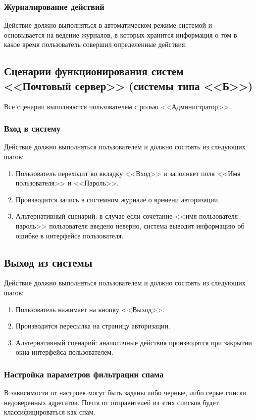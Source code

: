 \subsubsection{Журналирование действий}
Действие должно выполняться в автоматическом режиме системой и основывается на ведение журналов, в которых хранится информация о том в какое время пользователь совершил определенные действия.

\subsection{Сценарии функционирования систем <<Почтовый сервер>> (системы типа <<Б>>)}
Все сценарии выполняются пользователем с ролью <<Администратор>>.

\subsubsection{Вход в систему}

Действие должно выполняться пользователем и должно состоять из следующих шагов:
\begin{enumerate}
  \item Пользователь переходит во вкладку <<Вход>> и заполняет поля <<Имя пользователя>> и <<Пароль>>.
  \item Производится запись в системном журнале о времени авторизации.
  \item Альтернативный сценарий: в случае если сочетание <<имя пользователя - пароль>> пользователя введено неверно, система выводит информацию об ошибке в интерфейсе пользователя.
\end{enumerate}

\subsection{Выход из системы}
Действие должно выполняться пользователем и должно состоять из следующих шагов:
\begin{enumerate}
  \item Пользователь нажимает на кнопку <<Выход>>.
  \item Производится пересылка на страницу авторизации.
  \item Альтернативный сценарий: аналогичные действия производятся при закрытии окна интерфейса пользователем.
\end{enumerate}

\subsubsection{Настройка параметров фильтрации спама}
В зависимости от настроек могут быть заданы либо черные, либо серые списки недоверенных адресатов. Почта от отправителей из этих списков будет классифицироваться как спам.


